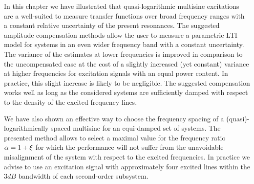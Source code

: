 In this chapter we have illustrated that quasi-logarithmic multisine excitations are a well-suited to measure transfer functions over broad frequency ranges with a constant relative uncertainty of the present resonances.
The suggested amplitude compensation methods allow the user to measure a parametric \gls{LTI} model for systems in an even wider frequency band with a constant uncertainty.
The variance of the estimates at lower frequencies is improved in comparison to the uncompensated case at the cost of a slightly increased (yet constant) variance at higher frequencies for excitation signals with an equal power content.
In practice, this slight increase is likely to be negligible.
The suggested compensation works well as long as the considered systems are sufficiently damped with respect to the density of the excited frequency lines.

We have also shown an effective way to choose the frequency spacing of a (quasi)-logarithmically spaced multisine for an equi-damped set of systems.
The presented method allows to select a maximal value for the frequency ratio $\alpha = 1 + \xi_{}$ for which the performance will not suffer from the unavoidable misalignment of the system with respect to the excited frequencies.
In practice we advise to use an excitation signal with approximately four excited lines within the $3\unit{dB}$ bandwidth of each second-order subsystem.
